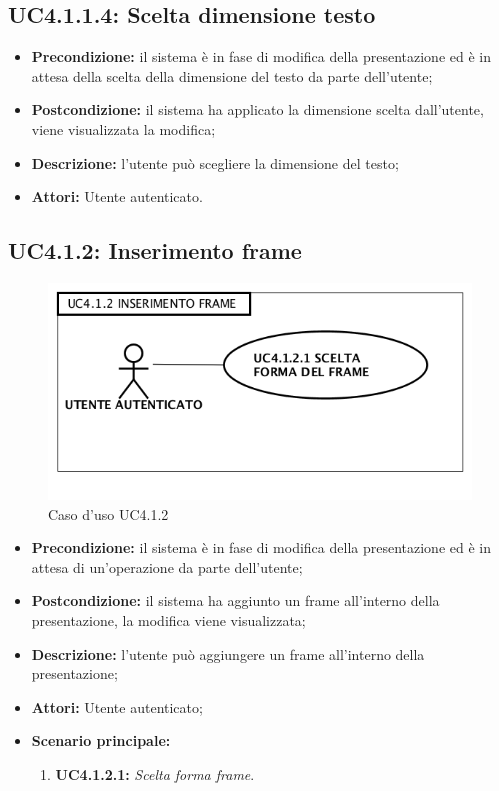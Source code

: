 \subsection{ UC4.1.1.4: Scelta dimensione testo}

\begin{itemize}
	\item \textbf{Precondizione:} il sistema è in fase di modifica della presentazione ed è in attesa della scelta della dimensione del testo da parte dell'utente;
	\item \textbf{Postcondizione:} il sistema ha applicato la dimensione scelta dall'utente, viene visualizzata la modifica;
	\item \textbf{Descrizione:} l'utente può scegliere la dimensione del testo;
	\item \textbf{Attori:} Utente autenticato.
\end{itemize}
\subsection{ UC4.1.2: Inserimento frame}

\begin{figure}[h]
	\begin{center}
	\includegraphics[scale=0.4]{diagram/UC4-1-2.png}
	\caption{Caso d'uso UC4.1.2}
	\end{center}
\end{figure}
\begin{itemize}
	\item \textbf{Precondizione:} il sistema è in fase di modifica della presentazione ed è in attesa di un'operazione da parte dell'utente;
	\item \textbf{Postcondizione:} il sistema ha aggiunto un frame all'interno della presentazione, la modifica viene visualizzata;
	\item \textbf{Descrizione:} l'utente può aggiungere un frame all'interno della presentazione;
	\item \textbf{Attori:} Utente autenticato;
	\item \textbf{Scenario principale:}
	\begin{enumerate}
		\item \textbf{ UC4.1.2.1:} \textit{ Scelta forma frame}.
	\end{enumerate}
\end{itemize}
